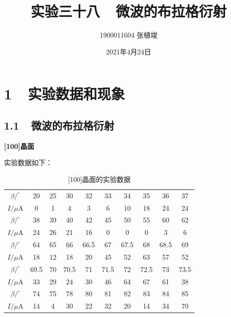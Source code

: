 \documentclass[a4paper,fontset=windows]{ctexbook}
\begin{document}
    \title{\textbf{实验三十八\ \ 微波的布拉格衍射}}
    \author{1900011604 张植竣}
    \date{2021年4月24日}

    \maketitle

    \section*{1\ \ 实验数据和现象}
    
    \subsection*{1.1\ \ 微波的布拉格衍射}
    
    {\large\textbf{[100]晶面}}
    
    实验数据如下：
    
    \begin{table}[!htbp]
        \begin{center}
            \begin{tabular}{|c|c|c|c|c|c|c|c|c|c|}
                \hline
                $\beta/^\circ$ & 20 & 25 & 30 & 32 & 33 & 34 & 35 & 36 & 37 \\
                $I/\mu\mathrm{A}$ & 0 & 1 & 4 & 3 & 6 & 10 & 18 & 24 & 24 \\
                \hline
                $\beta/^\circ$ & 38 & 39 & 40 & 42 & 45 & 50 & 55 & 60 & 62 \\
                $I/\mu\mathrm{A}$ & 24 & 26 & 21 & 16 & 0 & 0 & 0 & 3 & 6 \\
                \hline
                $\beta/^\circ$ & 64 & 65 & 66 & 66.5 & 67 & 67.5 & 68 & 68.5 & 69 \\
                $I/\mu\mathrm{A}$ & 18 & 12 & 18 & 20 & 45 & 52 & 63 & 57 & 52 \\
                \hline
                $\beta/^\circ$ & 69.5 & 70 & 70.5 & 71 & 71.5 & 72 & 72.5 & 73 & 73.5 \\
                $I/\mu\mathrm{A}$ & 33 & 29 & 24 & 30 & 46 & 64 & 67 & 61 & 38 \\
                \hline
                $\beta/^\circ$ & 74 & 75 & 78 & 80 & 81 & 82 & 83 & 84 & 85 \\
                $I/\mu\mathrm{A}$ & 14 & 4 & 30 & 22 & 32 & 20 & 14 & 34 & 70 \\
                \hline
            \end{tabular}
        \end{center}
        \caption{[100]晶面的实验数据}
    \end{table}
    
\end{document}
